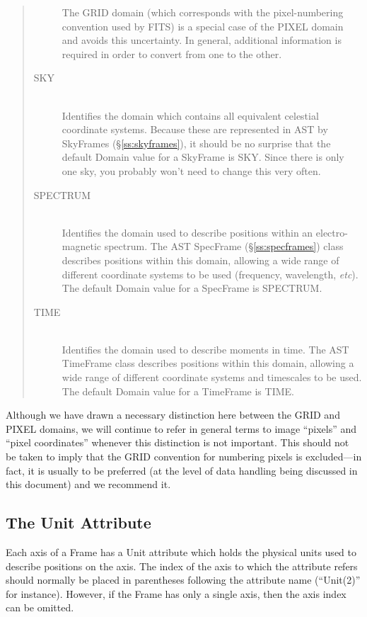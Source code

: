 \documentclass[twoside,11pt]{article}
\newcommand{\secref}[1]{\S\ref{#1}}
\newcommand{\secref}[1]{\ref{#1}}
\begin{document}
\begin{quote}
\begin{description}
The GRID domain (which corresponds with the pixel-numbering convention
used by FITS) is a special case of the PIXEL domain and avoids this
uncertainty. In general, additional information is required in order
to convert from one to the other.

\item[SKY]\mbox{}\\
Identifies the domain which contains all equivalent celestial
coordinate systems. Because these are represented in AST by SkyFrames
(\secref{ss:skyframes}), it should be no surprise that the default
Domain value for a SkyFrame is SKY. Since there is only one sky, you
probably won't need to change this very often.

\item[SPECTRUM]\mbox{}\\
Identifies the domain used to describe positions within an
electro-magnetic spectrum. The AST SpecFrame (\secref{ss:specframes})
class describes positions within this domain, allowing a wide range of
different coordinate systems to be used (frequency, wavelength,
{\em{etc}}). The default Domain value for a SpecFrame is SPECTRUM.

\item[TIME]\mbox{}\\
Identifies the domain used to describe moments in time. The AST TimeFrame 
class describes positions within this domain, allowing a wide range of
different coordinate systems and timescales to be used. The default Domain 
value for a TimeFrame is TIME.

\end{description}
\end{quote}

Although we have drawn a necessary distinction here between the GRID
and PIXEL domains, we will continue to refer in general terms to image
``pixels'' and ``pixel coordinates'' whenever this distinction is not
important. This should not be taken to imply that the GRID convention
for numbering pixels is excluded---in fact, it is usually to be
preferred (at the level of data handling being discussed in this
document) and we recommend it.

\subsection{\label{ss:frameunits}The Unit Attribute}
Each axis of a Frame has a Unit attribute which holds the physical units used
to describe positions on the axis. The index of the axis to which the 
attribute refers should normally be placed in parentheses following the
attribute name (``Unit(2)'' for instance). However, if the Frame has only
a single axis, then the axis index can be omitted.
\end{document}
